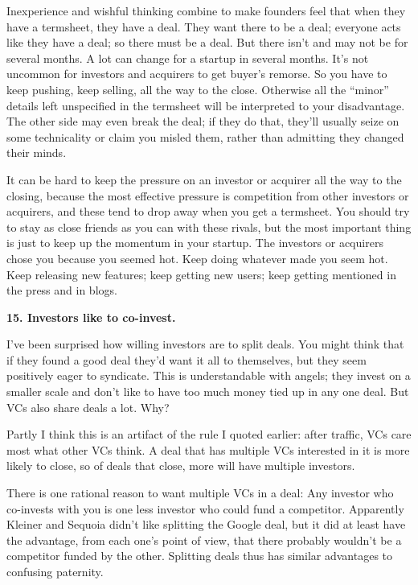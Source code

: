 Inexperience and wishful thinking combine to make founders feel that
when they have a termsheet, they have a deal. They want there to be a
deal; everyone acts like they have a deal; so there must be a deal. But
there isn't and may not be for several months. A lot can change for a
startup in several months. It's not uncommon for investors and acquirers
to get buyer's remorse. So you have to keep pushing, keep selling, all
the way to the close. Otherwise all the ``minor'' details left
unspecified in the termsheet will be interpreted to your disadvantage.
The other side may even break the deal; if they do that, they'll usually
seize on some technicality or claim you misled them, rather than
admitting they changed their minds.

It can be hard to keep the pressure on an investor or acquirer all the
way to the closing, because the most effective pressure is competition
from other investors or acquirers, and these tend to drop away when you
get a termsheet. You should try to stay as close friends as you can with
these rivals, but the most important thing is just to keep up the
momentum in your startup. The investors or acquirers chose you because
you seemed hot. Keep doing whatever made you seem hot. Keep releasing
new features; keep getting new users; keep getting mentioned in the
press and in blogs.

\textbf{15. Investors like to co-invest.}

I've been surprised how willing investors are to split deals. You might
think that if they found a good deal they'd want it all to themselves,
but they seem positively eager to syndicate. This is understandable with
angels; they invest on a smaller scale and don't like to have too much
money tied up in any one deal. But VCs also share deals a lot. Why?

Partly I think this is an artifact of the rule I quoted earlier: after
traffic, VCs care most what other VCs think. A deal that has multiple
VCs interested in it is more likely to close, so of deals that close,
more will have multiple investors.

There is one rational reason to want multiple VCs in a deal: Any
investor who co-invests with you is one less investor who could fund a
competitor. Apparently Kleiner and Sequoia didn't like splitting the
Google deal, but it did at least have the advantage, from each one's
point of view, that there probably wouldn't be a competitor funded by
the other. Splitting deals thus has similar advantages to confusing
paternity.

